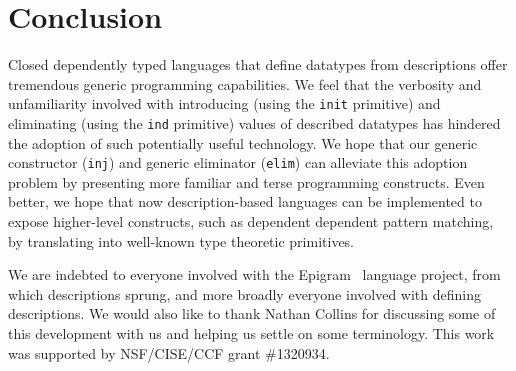 \documentclass[preprint,nonatbib]{sigplanconf}
\begin{document}
\section{Conclusion}
\label{sec:conclusion}

Closed dependently typed languages that define datatypes from
descriptions offer tremendous generic programming capabilities. 
We feel that the verbosity and unfamiliarity involved with 
introducing (using the {\tt init} primitive)
and eliminating (using the {\tt ind} primitive)
values of described datatypes has hindered the adoption of such
potentially useful technology. We hope that our generic
constructor ({\tt inj}) and generic eliminator ({\tt elim}) can
alleviate this adoption problem by presenting more familiar and terse
programming constructs. Even better, we hope that now description-based
languages can be implemented to expose higher-level
constructs, such as dependent dependent pattern matching, by
translating into well-known type theoretic primitives.

\acks

We are indebted to everyone involved with the
{\sc Epigram}~\citep{mcbride2005epigram} language project, from which
descriptions sprung, and more broadly everyone involved with defining
descriptions.
We would also like to thank Nathan Collins for discussing some of this
development with us and helping us settle on some terminology. This
work was supported by NSF/CISE/CCF grant \#1320934.



\end{document}

